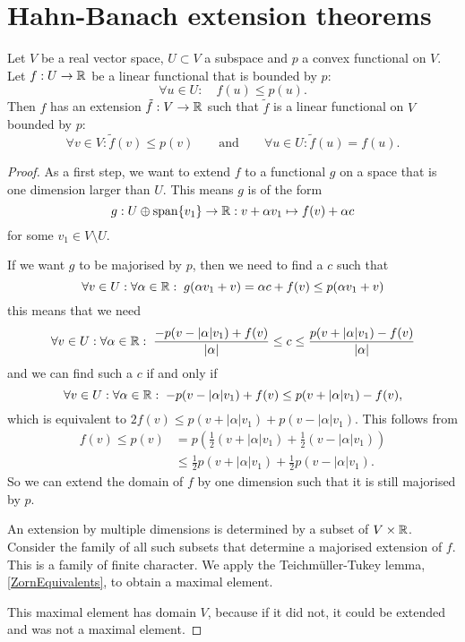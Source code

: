 \section{Hahn-Banach extension theorems}
\begin{theorem} \label{convexHahnBanach}
Let $V$ be a real vector space, $U\subset V$ a subspace and $p$ a convex functional on $V$. Let $f:U\to\mathbb{R}$ be a linear functional that is bounded by $p$:
\[ \forall u\in U: \quad f(u) \leq p(u). \]
Then $f$ has an extension $\tilde{f}: V\to \mathbb{R}$ such that $\tilde{f}$ is a linear functional on $V$ bounded by $p$:
\[ \forall v\in V: \tilde{f}(v) \leq p(v) \qquad \text{and} \qquad \forall u\in U: \tilde{f}(u) = f(u). \]
\end{theorem}
\begin{proof}
As a first step, we want to extend $f$ to a functional $g$ on a space that is one dimension larger than $U$. This means $g$ is of the form
\[ g: U\oplus\operatorname{span}\{v_1\}\to\mathbb{R}: v + \alpha v_1 \mapsto f(v) + \alpha c \]
for some $v_1\in V\setminus U$.

If we want $g$ to be majorised by $p$, then we need to find a $c$ such that
\[ \forall v\in U: \forall \alpha\in\mathbb{R}: \; g(\alpha v_1 + v) = \alpha c + f(v) \leq p(\alpha v_1 + v) \]
this means that we need
\[ \forall v\in U: \forall \alpha\in\mathbb{R}:\; \frac{-p(v - |\alpha|v_1) + f(v)}{|\alpha|} \leq c \leq \frac{p(v + |\alpha|v_1) - f(v)}{|\alpha|} \]
and we can find such a $c$ if and only if
\[ \forall v\in U: \forall \alpha\in\mathbb{R}:\; -p(v - |\alpha|v_1) + f(v) \leq p(v + |\alpha|v_1) - f(v), \]
which is equivalent to $2f(v) \leq p(v+|\alpha|v_1)+p(v-|\alpha|v_1)$. This follows from
\begin{align*}
f(v) \leq p(v) &= p(\tfrac{1}{2}(v+|\alpha|v_1) + \tfrac{1}{2}(v-|\alpha|v_1)) \\
&\leq \tfrac{1}{2}p(v+|\alpha|v_1) + \tfrac{1}{2}p(v-|\alpha|v_1).
\end{align*}
So we can extend the domain of $f$ by one dimension such that it is still majorised by $p$.

An extension by multiple dimensions is determined by a subset of $V\times \mathbb{R}$. Consider the family of all such subsets that determine a majorised extension of $f$. This is a family of finite character. We apply the Teichmüller-Tukey lemma, \ref{ZornEquivalents}, to obtain a maximal element.

This maximal element has domain $V$, because if it did not, it could be extended and was not a maximal element.
\end{proof}

